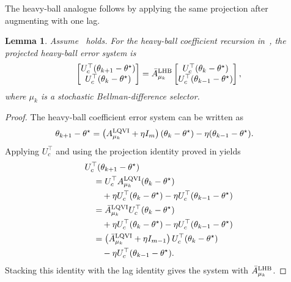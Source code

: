 \documentclass[letterpaper]{article}
\numberwithin{equation}{section}
\newtheorem{lemma}{Lemma}[section]
\begin{document}
The heavy-ball analogue follows by applying the same projection after augmenting
with one lag.
\begin{lemma}
\label{lem:linear-fa-heavy-ball-projected-error-system}
Assume~ holds. For the heavy-ball coefficient
recursion in~, the projected
heavy-ball error system is
\begin{equation*}
  \begin{bmatrix}
    U_c^\top(\theta_{k+1}-\theta^\star)\\
    U_c^\top(\theta_k-\theta^\star)
  \end{bmatrix}
  =\bar A_{\mu_k}^{\rm LHB}
  \begin{bmatrix}
    U_c^\top(\theta_k-\theta^\star)\\
    U_c^\top(\theta_{k-1}-\theta^\star)
  \end{bmatrix},
\end{equation*}
where $\mu_k$ is a stochastic Bellman-difference selector.
\end{lemma}
\begin{proof}
The heavy-ball coefficient error system can be written as
\begin{align*}
  \theta_{k+1}-\theta^\star
  &=\left(A_{\mu_k}^{\rm LQVI}+\eta I_m\right)(\theta_k-\theta^\star)
    -\eta(\theta_{k-1}-\theta^\star).
\end{align*}
Applying $U_c^\top$ and using the projection identity proved in
 yields
\begin{equation*}
\begin{aligned}
&U_c^\top(\theta_{k+1}-\theta^\star)\\
&\quad=U_c^\top A_{\mu_k}^{\rm LQVI}(\theta_k-\theta^\star)\\
&\qquad+\eta U_c^\top(\theta_k-\theta^\star)
  -\eta U_c^\top(\theta_{k-1}-\theta^\star)\\
&\quad=\bar A_{\mu_k}^{\rm LQVI}U_c^\top(\theta_k-\theta^\star)\\
&\qquad+\eta U_c^\top(\theta_k-\theta^\star)
  -\eta U_c^\top(\theta_{k-1}-\theta^\star)\\
&\quad=\left(\bar A_{\mu_k}^{\rm LQVI}+\eta I_{m-1}\right)
  U_c^\top(\theta_k-\theta^\star)\\
&\qquad-\eta U_c^\top(\theta_{k-1}-\theta^\star).
\end{aligned}
\end{equation*}
Stacking this identity with the lag identity gives the system with
$\bar A_{\mu_k}^{\rm LHB}$.
\end{proof}
\end{document}
